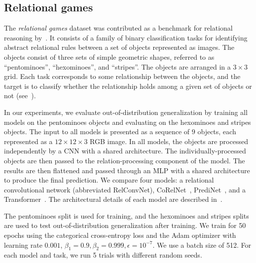 \subsection{Relational games}\label{ssec:exp_relational_games}

The \textit{relational games} dataset was contributed as a benchmark for relational reasoning by~\citep{shanahanExplicitlyRelationalNeural}. It consists of a family of binary classification tasks for identifying abstract relational rules between a set of objects represented as images. The objects consist of three sets of simple geometric shapes, referred to as ``pentominoes'', ``hexominoes'', and ``stripes''. The objects are arranged in a $3 \times 3$ grid. Each task corresponds to some relationship between the objects, and the target is to classify whether the relationship holds among a given set of objects or not (see~).

In our experiments, we evaluate out-of-distribution generalization by training all models on the pentominoes objects and evaluating on the hexominoes and stripes objects. The input to all models is presented as a sequence of $9$ objects, each represented as a $12 \times 12 \times 3$ RGB image. In all models, the objects are processed independently by a CNN with a shared architecture. The individually-processed objects are then passed to the relation-processing component of the model. The results are then flattened and passed through an MLP with a shared architecture to produce the final prediction. We compare four models: a relational convolutional network (abbreviated RelConvNet), CoRelNet~\citep{kergNeuralArchitecture2022}, PrediNet~\citep{shanahanExplicitlyRelationalNeural}, and a Transformer~\citep{vaswani2017attention}. The architectural details of each model are described in~.

The pentominoes split is used for training,
and the hexominoes and stripes splits are used to test out-of-distribution generalization after training. We train for 50 epochs using the categorical cross-entropy loss and the Adam optimizer with learning rate $0.001$, $\beta_1 = 0.9, \beta_2 = 0.999, \epsilon = 10^{-7}$. We use a batch size of 512. For each model and task, we run 5 trials with different random seeds.

